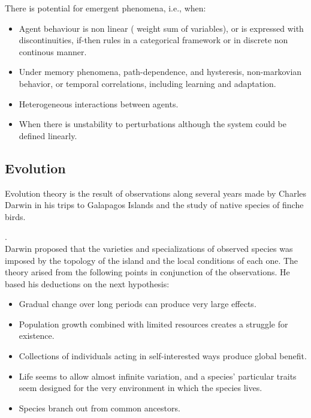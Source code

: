 \documentclass[11pt,oneside,a4paper,openright]{report}
\begin{document}


There is potential for emergent phenomena, i.e., when: 
\begin{itemize}
 \item Agent behaviour is non linear ( weight sum of variables), or is expressed with discontinuities, if-then rules in a categorical framework or in discrete non continous manner.
 \item Under memory phenomena, path-dependence, and hysteresis, non-markovian behavior, or temporal correlations, including learning and adaptation. 
 \item Heterogeneous interactions between agents.
 \item When there is unstability to perturbations although the system could be defined linearly.
\end{itemize}


\subsection{Evolution}

Evolution theory is the result of observations along several years made by Charles Darwin in his trips to Galapagos Islands and the study of native species of finche birds. 

. 
\\
Darwin proposed that the varieties and specializations of observed species was imposed by the topology of the 
island and the local conditions of each one. The theory arised from the following points in conjunction of the observations. He based his deductions on the next hypothesis:
\begin{itemize}
	\item Gradual change over long periods can produce very large effects.
	\item Population growth combined with limited resources creates a struggle for
	existence. 
	\item Collections of individuals acting in self-interested ways produce
	global benefit. 
	\item Life seems to allow almost infinite variation, and a species’
	particular traits seem designed for the very environment in which the species
	lives. 
	\item Species branch out from common ancestors.
\end{itemize}
\end{document}
